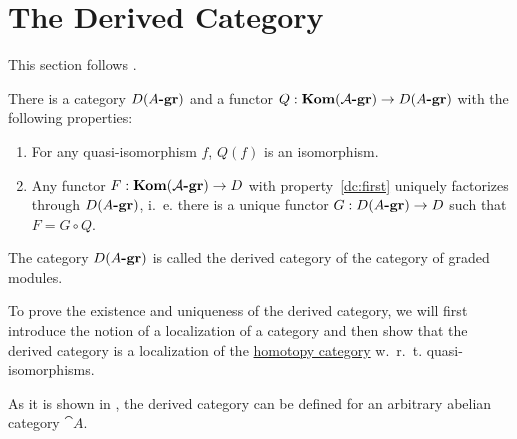 \section{The Derived Category}
This section follows \cite{gelfand}.

\begin{theorem}
    There is a category $D(A\textrm{\textup{\textbf{-gr}}})$ and a functor $Q: \textrm{\textup{\textbf{Kom}}}(\mathcal{A\textrm{\textup{\textbf{-gr}}}}) \rightarrow D(A\textrm{\textup{\textbf{-gr}}})$ with the following properties:
    \begin{enumerate}[label=(\roman*)]
        \item \label{dc:first} For any quasi-isomorphism $f$, $Q(f)$ is an isomorphism.
        \item Any functor $F: \textrm{\textup{\textbf{Kom}}}(\mathcal{A\textrm{\textup{\textbf{-gr}}}}) \rightarrow D$ with property~\ref{dc:first} uniquely factorizes through $D(A\textrm{\textup{\textbf{-gr}}})$, i.~e. there is a unique functor $G: D(A\textrm{\textup{\textbf{-gr}}}) \rightarrow D$ such that $F = G \circ Q$.
    \end{enumerate}

    The category $D(A\textrm{\textup{\textbf{-gr}}})$ is called the derived category of the category of graded modules.
\end{theorem}

To prove the existence and uniqueness of the derived category, we will first introduce the notion of a localization of a category and then show that the derived category is a localization of the \hyperref[def:homCat]{homotopy category} w.~r.~t. quasi-isomorphisms.

\begin{remark}
    As it is shown in \cite{gelfand}, the derived category can be defined for an arbitrary abelian category $\cat{A}$.
\end{remark}
